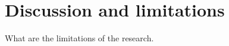 \documentclass[main.tex]{subfiles}
\begin{document}
    \section{Discussion and limitations}\label{sec:discussion}
    What are the limitations of the research. 
\end{document}
